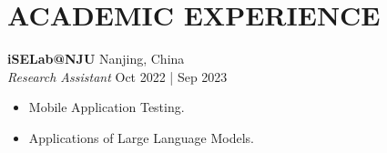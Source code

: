 \section*{ACADEMIC EXPERIENCE}
\noindent
\textbf{iSELab@NJU} \hfill Nanjing, China\\ %
\textit{Research Assistant} \hfill Oct 2022 | Sep 2023 %
\begin{itemize}[noitemsep]
    \item Mobile Application Testing.
    \item Applications of Large Language Models.
\end{itemize}